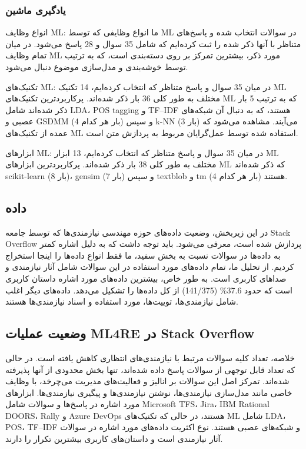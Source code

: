 \documentclass[a4paper,10pt]{article}
\begin{document}
            \subsubsection{یادگیری ماشین}
            
                انواع وظایف ML: ما انواع وظایفی که توسط ML در سوالات انتخاب شده و پاسخ‌های متناظر با آنها ذکر شده را ثبت کرده‌ایم که شامل 35 سوال و 28 پاسخ می‌شود. در میان تمام وظایف ML مورد ذکر، بیشترین تمرکز بر روی دسته‌بندی است، که به ترتیب توسط خوشه‌بندی و مدل‌سازی موضوع دنبال می‌شود.

                تکنیک‌های ML: در میان 35 سوال و پاسخ متناظر که انتخاب کرده‌ایم، 14 تکنیک ML مختلف به طور کلی 36 بار ذکر شده‌اند. پرکاربردترین تکنیک‌های ML که به ترتیب 5 بار ذکر شده‌اند شامل LDA، POS tagging و TF–IDF هستند، که به دنبال آن شبکه‌های عصبی و GSDMM (4 بار هر کدام) و سپس k-NN (3 بار) می‌آیند. مشاهده می‌شود که عمده از تکنیک‌های ML استفاده شده توسط عمل‌گرایان مربوط به پردازش متن است.

                ابزارهای ML: در میان 35 سوال و پاسخ متناظر که انتخاب کرده‌ایم، 13 ابزار ML مختلف به طور کلی 38 بار ذکر شده‌اند. پرکاربردترین ابزارهای ML که ذکر شده‌اند scikit-learn (8 بار)، gensim (7 بار) و سپس textblob و tm (4 بار هر کدام) هستند.

        \subsection{داده}

            در این زیربخش، وضعیت داده‌های حوزه مهندسی نیازمندی‌ها که توسط جامعه Stack Overflow پردازش شده است، معرفی می‌شود. باید توجه داشت که به دلیل اشاره کمتر به داده‌ها در سوالات نسبت به بخش سفید، ما فقط انواع داده‌ها را اینجا استخراج کردیم. از تحلیل ما، تمام داده‌های مورد استفاده در این سوالات شامل آثار نیازمندی و صداهای کاربری است. به طور خاص، بیشترین داده‌های مورد اشاره داستان کاربری است که حدود 37.6\% (141/375) از کل داده‌ها را تشکیل می‌دهد. داده‌های دیگر اغلب شامل نیازمندی‌ها، توییت‌ها، مورد استفاده و اسناد نیازمندی‌ها هستند.

        \subsection{وضعیت عملیات ML4RE در Stack Overflow}

            خلاصه، تعداد کلیه سوالات مرتبط با نیازمندی‌های انتظاری کاهش یافته است. در حالی که تعداد قابل توجهی از سوالات پاسخ داده شده‌اند، تنها بخش محدودی از آنها پذیرفته شده‌اند. تمرکز اصل  این سوالات بر انالیز و فعالیت‌های مدیریت می‌چرخد، با وظایف خاصی مانند مدل‌سازی نیازمندی‌ها، نوشتن نیازمندی‌ها و پیگیری نیازمندی‌ها. ابزارهای مورد اشاره در پاسخ‌ها و سوالات شامل Microsoft TFS، Jira، IBM Rational DOORS، Rally و Azure DevOps هستند، در حالی که تکنیک‌های ML شامل LDA، POS، TF–IDF و شبکه‌های عصبی هستند. نوع اکثریت داده‌های مورد اشاره در سوالات آثار نیازمندی است و داستان‌های کاربری بیشترین تکرار را دارند.
\end{document}

